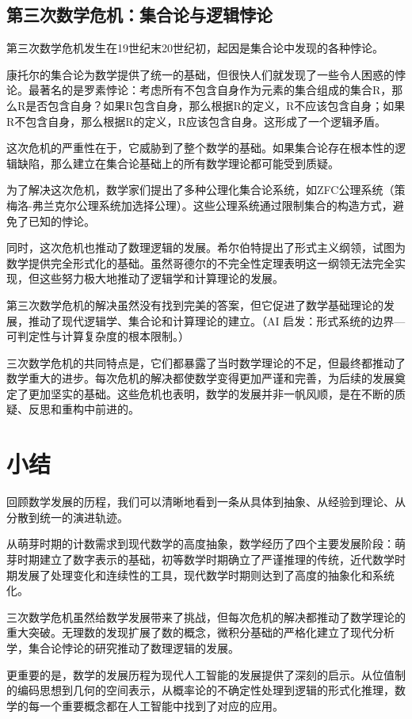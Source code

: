 \subsection{第三次数学危机：集合论与逻辑悖论}
第三次数学危机发生在19世纪末20世纪初，起因是集合论中发现的各种悖论。

康托尔的集合论为数学提供了统一的基础，但很快人们就发现了一些令人困惑的悖论。最著名的是罗素悖论：考虑所有不包含自身作为元素的集合组成的集合R，那么R是否包含自身？如果R包含自身，那么根据R的定义，R不应该包含自身；如果R不包含自身，那么根据R的定义，R应该包含自身。这形成了一个逻辑矛盾。

这次危机的严重性在于，它威胁到了整个数学的基础。如果集合论存在根本性的逻辑缺陷，那么建立在集合论基础上的所有数学理论都可能受到质疑。

为了解决这次危机，数学家们提出了多种公理化集合论系统，如ZFC公理系统（策梅洛-弗兰克尔公理系统加选择公理）。这些公理系统通过限制集合的构造方式，避免了已知的悖论。

同时，这次危机也推动了数理逻辑的发展。希尔伯特提出了形式主义纲领，试图为数学提供完全形式化的基础。虽然哥德尔的不完全性定理表明这一纲领无法完全实现，但这些努力极大地推动了逻辑学和计算理论的发展。

第三次数学危机的解决虽然没有找到完美的答案，但它促进了数学基础理论的发展，推动了现代逻辑学、集合论和计算理论的建立。{（AI 启发：形式系统的边界—可判定性与计算复杂度的根本限制。）}

三次数学危机的共同特点是，它们都暴露了当时数学理论的不足，但最终都推动了数学重大的进步。每次危机的解决都使数学变得更加严谨和完善，为后续的发展奠定了更加坚实的基础。这些危机也表明，数学的发展并非一帆风顺，是在不断的质疑、反思和重构中前进的。

\section{小结}
回顾数学发展的历程，我们可以清晰地看到一条从具体到抽象、从经验到理论、从分散到统一的演进轨迹。

从萌芽时期的计数需求到现代数学的高度抽象，数学经历了四个主要发展阶段：萌芽时期建立了数字表示的基础，初等数学时期确立了严谨推理的传统，近代数学时期发展了处理变化和连续性的工具，现代数学时期则达到了高度的抽象化和系统化。

三次数学危机虽然给数学发展带来了挑战，但每次危机的解决都推动了数学理论的重大突破。无理数的发现扩展了数的概念，微积分基础的严格化建立了现代分析学，集合论悖论的研究推动了数理逻辑的发展。

更重要的是，数学的发展历程为现代人工智能的发展提供了深刻的启示。从位值制的编码思想到几何的空间表示，从概率论的不确定性处理到逻辑的形式化推理，数学的每一个重要概念都在人工智能中找到了对应的应用。

